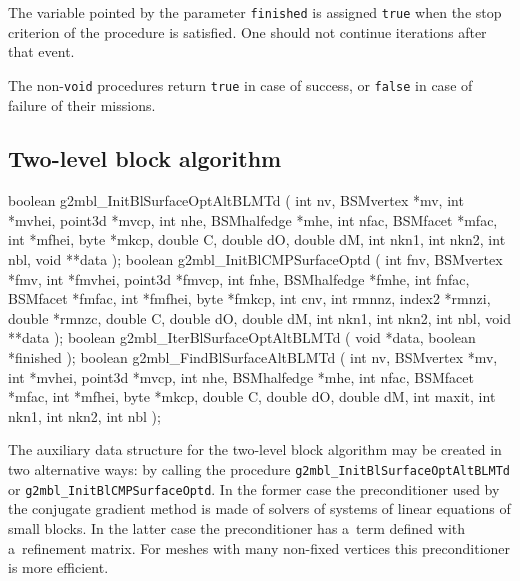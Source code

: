 The variable pointed by the parameter \texttt{finished} is assigned
\texttt{true} when the stop criterion of the procedure is satisfied. One
should not continue iterations after that event.

The non-\texttt{void} procedures return \texttt{true} in case of success, or
\texttt{false} in case of failure of their missions.


\newpage
\subsection{Two-level block algorithm}

\medskip
\begin{listingC}
boolean g2mbl_InitBlSurfaceOptAltBLMTd (
                    int nv, BSMvertex *mv, int *mvhei,
                    point3d *mvcp, int nhe, BSMhalfedge *mhe,
                    int nfac, BSMfacet *mfac, int *mfhei,
                    byte *mkcp,
                    double C, double dO, double dM,
                    int nkn1, int nkn2, int nbl,   
                    void **data );
boolean g2mbl_InitBlCMPSurfaceOptd (
                int fnv, BSMvertex *fmv, int *fmvhei, point3d *fmvcp,
                int fnhe, BSMhalfedge *fmhe,
                int fnfac, BSMfacet *fmfac, int *fmfhei,
                byte *fmkcp,
                int cnv,
                int rmnnz, index2 *rmnzi, double *rmnzc,
                double C, double dO, double dM,
                int nkn1, int nkn2, int nbl,   
                void **data );
boolean g2mbl_IterBlSurfaceOptAltBLMTd ( void *data,
                                         boolean *finished );
boolean g2mbl_FindBlSurfaceAltBLMTd (
                    int nv, BSMvertex *mv, int *mvhei,
                    point3d *mvcp, int nhe, BSMhalfedge *mhe,
                    int nfac, BSMfacet *mfac, int *mfhei,
                    byte *mkcp,
                    double C, double dO, double dM,
                    int maxit, int nkn1, int nkn2, int nbl );
\end{listingC}
The auxiliary data structure for the two-level block algorithm may be
created in two alternative ways: by calling the procedure
\texttt{g2mbl\_InitBlSurfaceOptAltBLMTd} or
\texttt{g2mbl\_InitBlCMPSurfaceOptd}. In the former case the preconditioner
used by the conjugate gradient method is made of solvers of systems of linear
equations of small blocks. In the latter case the preconditioner has a~term
defined with a~refinement matrix. For meshes with many non-fixed vertices
this preconditioner is more efficient.

